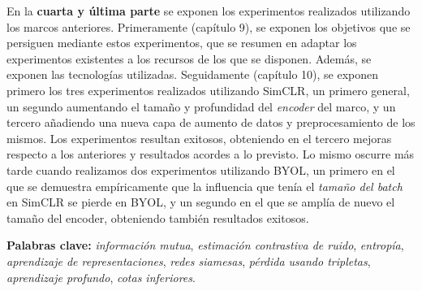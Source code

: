 En la \textbf{cuarta y última parte} se exponen los experimentos realizados utilizando los marcos anteriores. Primeramente (capítulo 9), se exponen los objetivos que se persiguen mediante estos experimentos, que se resumen en adaptar los experimentos existentes a los recursos de los que se disponen. Además, se exponen las tecnologías utilizadas. Seguidamente (capítulo 10), se exponen primero los tres experimentos realizados utilizando SimCLR, un primero general, un segundo aumentando el tamaño y profundidad del \emph{encoder} del marco, y un tercero añadiendo una nueva capa de aumento de datos y preprocesamiento de los mismos. Los experimentos resultan exitosos, obteniendo en el tercero mejoras respecto a los anteriores y resultados acordes a lo previsto. Lo mismo oscurre más tarde cuando realizamos dos experimentos utilizando BYOL, un primero en el que se demuestra empíricamente que la influencia que tenía el \emph{tamaño del batch} en SimCLR se pierde en BYOL, y un segundo en el que se amplía de nuevo el tamaño del encoder, obteniendo también resultados exitosos.

\textbf{Palabras clave:} \emph{información mutua}, \emph{estimación contrastiva de ruido}, \emph{entropía}, \emph{aprendizaje de representaciones}, \emph{redes siamesas}, \emph{pérdida usando tripletas}, \emph{aprendizaje profundo}, \emph{cotas inferiores}.
